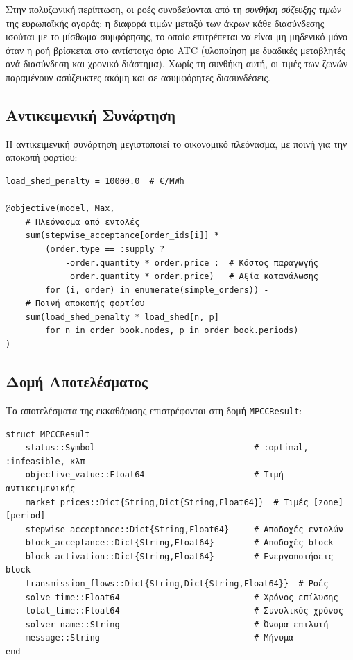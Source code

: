 Στην πολυζωνική περίπτωση, οι ροές συνοδεύονται από τη \emph{συνθήκη σύζευξης τιμών} της ευρωπαϊκής αγοράς: η διαφορά τιμών μεταξύ των άκρων κάθε διασύνδεσης ισούται με το μίσθωμα συμφόρησης, το οποίο επιτρέπεται να είναι μη μηδενικό μόνο όταν η ροή βρίσκεται στο αντίστοιχο όριο ATC (υλοποίηση με δυαδικές μεταβλητές ανά διασύνδεση και χρονικό διάστημα). Χωρίς τη συνθήκη αυτή, οι τιμές των ζωνών παραμένουν ασύζευκτες ακόμη και σε ασυμφόρητες διασυνδέσεις.

\subsection{Αντικειμενική Συνάρτηση}
\label{subsec:mpcc-objective}

Η αντικειμενική συνάρτηση μεγιστοποιεί το οικονομικό πλεόνασμα, με ποινή για την αποκοπή φορτίου:

\begin{samepage}
\begin{verbatim}
load_shed_penalty = 10000.0  # €/MWh

@objective(model, Max,
    # Πλεόνασμα από εντολές
    sum(stepwise_acceptance[order_ids[i]] *
        (order.type == :supply ? 
            -order.quantity * order.price :  # Κόστος παραγωγής
             order.quantity * order.price)   # Αξία κατανάλωσης
        for (i, order) in enumerate(simple_orders)) -
    # Ποινή αποκοπής φορτίου
    sum(load_shed_penalty * load_shed[n, p] 
        for n in order_book.nodes, p in order_book.periods)
)
\end{verbatim}
\end{samepage}

\subsection{Δομή Αποτελέσματος}
\label{subsec:mpcc-result}

Τα αποτελέσματα της εκκαθάρισης επιστρέφονται στη δομή \texttt{MPCCResult}:

\begin{samepage}
\begin{verbatim}
struct MPCCResult
    status::Symbol                                # :optimal, :infeasible, κλπ
    objective_value::Float64                      # Τιμή αντικειμενικής
    market_prices::Dict{String,Dict{String,Float64}}  # Τιμές [zone][period]
    stepwise_acceptance::Dict{String,Float64}     # Αποδοχές εντολών
    block_acceptance::Dict{String,Float64}        # Αποδοχές block
    block_activation::Dict{String,Float64}        # Ενεργοποιήσεις block
    transmission_flows::Dict{String,Dict{String,Float64}}  # Ροές
    solve_time::Float64                           # Χρόνος επίλυσης
    total_time::Float64                           # Συνολικός χρόνος
    solver_name::String                           # Όνομα επιλυτή
    message::String                               # Μήνυμα
end
\end{verbatim}
\end{samepage}


